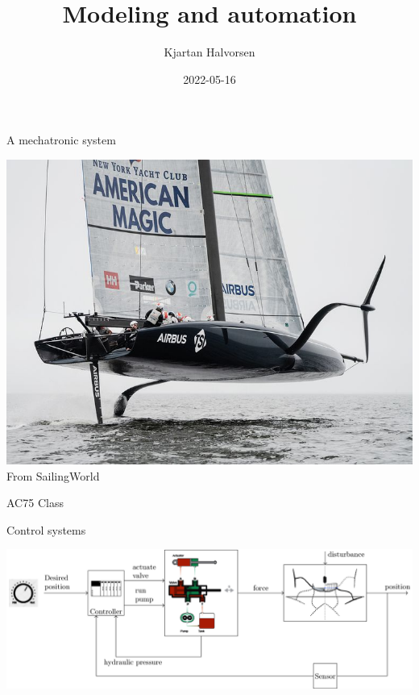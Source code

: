 \documentclass[dvisvgm,hypertex,aspectratio=169]{beamer}
\author{Kjartan Halvorsen}
\date{2022-05-16}
\title{Modeling and automation}
\begin{document}
\maketitle

\begin{frame}[label=Ex0]{A mechatronic system}

  \begin{center}
    \includegraphics[height=0.7\textheight]{ac75.jpeg}\\
    {\footnotesize  From SailingWorld}
  \end{center}

  AC75 Class
\end{frame}

\begin{frame}[label=I00]{Control systems}

\begin{center}
\includegraphics[width=1.0\textwidth]{ac75-control-block-details.png}
\end{center}

\end{frame}
\end{document}
